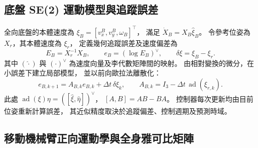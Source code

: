 \subsection{底盤 SE(2) 運動模型與追蹤誤差}
\label{subsec:base_se2_model_error}

全向底盤的本體速度為
$\xi_B=[v_x^B,v_y^B,\omega_B]^{\top}$，
滿足 $\dot X_B=X_B\widehat{\xi}_B$。
令參考位姿為 $X_r$，其本體速度為 $\xi_r$，
定義幾何追蹤誤差及速度偏差為
\begin{equation}
    E_B=X_r^{-1}X_B,\qquad
    e_B=(\log E_B)^\vee,\qquad
    \delta\xi=\xi_B-\xi_r .
    \label{eq:ch3_geometric_tracking_error}
\end{equation}
其中 $(\widehat{\cdot})$ 與 $(\cdot)^\vee$ 為速度向量及李代數矩陣間的映射。
由相對變換的微分，在小誤差下建立局部模型，
並以前向歐拉法離散化：
\begin{equation}
    e_{B,k+1}=A_{B,k}e_{B,k}+\Delta t\,\delta\xi_k,
    \qquad
    A_{B,k}=I_3-\Delta t\,\operatorname{ad}(\xi_{r,k}).
    \label{eq:ch3_discrete_base_error_model}
\end{equation}
此處 $\operatorname{ad}(\xi)\eta=
([\widehat\xi,\widehat\eta])^\vee$，
$[A,B]=AB-BA$。
控制器每次更新均由目前位姿重新計算誤差，
其近似精度取決於追蹤偏差、控制週期及預測時域。

\subsection{移動機械臂正向運動學與全身雅可比矩陣}
\label{subsec:wholebody_fk_jacobian}

